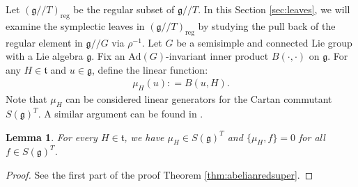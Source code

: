 \documentclass[11pt,reqno]{amsart}
\newtheorem*{theorem A}{Main Theorem A}
\newtheorem*{theorem B}{Main Theorem B}
\newtheorem*{theorem C}{Main Theorem C}
\newtheorem*{theorem D}{Main Theorem D}
\newtheorem{lemma}[theorem]{Lemma}
\theoremstyle{definition}
\theoremstyle{plain}
\theoremstyle{conclusion}
\begin{document}
Let $\left(\mathfrak{g}//T\right)_{\mathrm{reg}}$ be the regular subset of $\mathfrak{g}//T$. In this Section \ref{sec:leaves}, we will examine the symplectic leaves in $\left(\mathfrak{g}//T\right)_{\mathrm{reg}}$ by studying the pull back of the regular element in $\mathfrak{g}//G$ via $\rho^{-1}$.   Let $G$ be a semisimple and connected Lie group with a Lie algebra $\mathfrak{g}$. Fix an $\mathrm{Ad}(G)$-invariant inner product $ B( \cdot , \cdot )$ on $\mathfrak{g}$. For any $H\in\mathfrak{t}$ and $u\in\mathfrak{g}$, define the linear function:
\begin{align*}
\mu_H(u): = B(u,H)  .
\end{align*} Note that $\mu_H$ can be considered linear generators for the Cartan commutant $S(\mathfrak{g})^T$. A similar argument can be found in \cite[Proposition 2.5]{campoamor2026construction}.
\begin{lemma} 
\label{lem:mucenter}
For every $H\in\mathfrak{t}$, we have $\mu_H\in S(\mathfrak{g})^T$ and $\{\mu_H,f\} = 0$ for all $f\in S(\mathfrak{g})^T$.
\end{lemma}
\begin{proof}
See the first part of the proof Theorem \ref{thm:abelianredsuper}. %
\end{proof}
  
\end{document}
